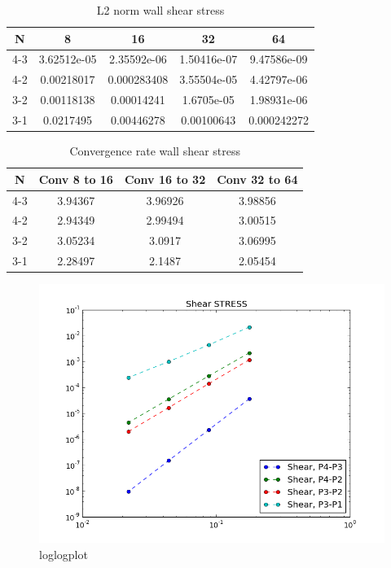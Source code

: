 \documentclass[a4paper,norsk]{article}
\begin{document}
\begin{table}[ht]
\caption {L2 norm wall shear stress}
\centering
\begin{tabular}{c|cccc}
\hline
\rowcolor{LightCyan}
N  &  8  &  16  &  32 &  64\\
\hline
4-3 & 3.62512e-05 & 2.35592e-06 & 1.50416e-07 & 9.47586e-09 \\ \hline
4-2 & 0.00218017  & 0.000283408 & 3.55504e-05 & 4.42797e-06 \\ \hline
3-2 & 0.00118138  & 0.00014241  & 1.6705e-05  & 1.98931e-06 \\ \hline
3-1 & 0.0217495   & 0.00446278  & 0.00100643  & 0.000242272 \\
\hline
\end{tabular}
\end{table}

\begin{table}[ht]
\caption {Convergence rate wall shear stress}
\centering
\begin{tabular}{c|ccc}
\hline
\rowcolor{LightCyan}
N  & Conv 8 to 16  &  Conv 16 to 32 &  Conv 32 to 64 \\
\hline
4-3 & 3.94367 & 3.96926 & 3.98856   \\ \hline
4-2 & 2.94349 & 2.99494 & 3.00515  \\ \hline
3-2 & 3.05234 & 3.0917  & 3.06995  \\ \hline
3-1 & 2.28497 & 2.1487  & 2.05454  \\
\hline
\end{tabular}
\end{table}

\begin{figure}[h!]
	\centering
	\caption*{loglogplot}
	\includegraphics[scale=0.4]{shear.png}
\end{figure}
\end{document}
